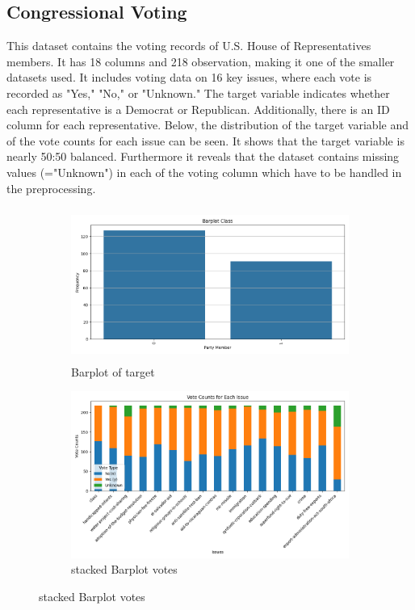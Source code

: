 \documentclass{article}
\begin{document}
\subsection{Congressional Voting}
This dataset contains the voting records of U.S. House of Representatives members. It has 18 columns and 218 observation, making it one of the smaller datasets used. It includes voting data on 16 key issues, where each vote is recorded as "Yes," "No," or "Unknown." The target variable indicates whether each representative is a Democrat or Republican. Additionally, there is an ID column for each representative. Below, the distribution of the target variable and of the vote counts for each issue can be seen. It shows that the target variable is nearly 50:50 balanced. Furthermore it reveals that the dataset contains missing values (="Unknown") in each of the voting column which have to be handled in the preprocessing.
\begin{figure}[H]
    \centering
    \begin{subfigure}[b]{0.45\textwidth}
        \centering
        \includegraphics[width=\linewidth, height=5cm]{barplot_target_votings.png} 
        \caption{Barplot of target}
        \label{fig:figure1}
    \end{subfigure}
    \hspace{0.05\textwidth} %
    \begin{subfigure}[b]{0.45\textwidth}
        \centering
        \includegraphics[width=\linewidth]{stacked_barplot.png} 
        \caption{stacked Barplot votes}
        \label{fig:figure2}
    \end{subfigure}
    \label{fig:two_figures}
\end{figure}
\end{document}
